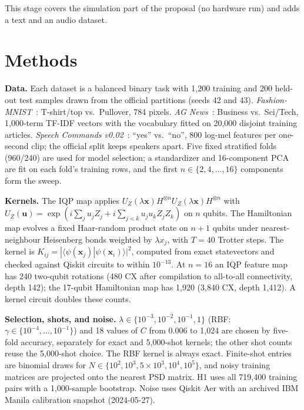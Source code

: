 \documentclass[conference]{IEEEtran}
\begin{document}
This stage covers the simulation part of the proposal (no hardware run) and adds a text and an audio dataset.

\section{Methods}
\textbf{Data.} Each dataset is a balanced binary task with 1{,}200 training and 200 held-out test samples drawn from the official partitions (seeds 42 and 43). \emph{Fashion-MNIST}~\cite{xiao2017fashion}: T-shirt/top vs.\ Pullover, 784 pixels. \emph{AG News}~\cite{zhang2015character}: Business vs.\ Sci/Tech, 1{,}000-term TF-IDF vectors with the vocabulary fitted on 20{,}000 disjoint training articles. \emph{Speech Commands v0.02}~\cite{warden2018speech}: ``yes'' vs.\ ``no'', 800 log-mel features per one-second clip; the official split keeps speakers apart. Five fixed stratified folds (960/240) are used for model selection; a standardizer and 16-component PCA are fit on each fold's training rows, and the first $n\in\{2,4,\dots,16\}$ components form the sweep.

\textbf{Kernels.} The IQP map applies $U_Z(\lambda\mathbf{x})H^{\otimes n}U_Z(\lambda\mathbf{x})H^{\otimes n}$ with $U_Z(\mathbf{u})=\exp(i\sum_j u_jZ_j+i\sum_{j<k}u_ju_kZ_jZ_k)$ on $n$ qubits. The Hamiltonian map evolves a fixed Haar-random product state on $n+1$ qubits under nearest-neighbour Heisenberg bonds weighted by $\lambda x_j$, with $T=40$ Trotter steps. The kernel is $K_{ij}=|\langle\psi(\mathbf{x}_j)|\psi(\mathbf{x}_i)\rangle|^{2}$, computed from exact statevectors and checked against Qiskit circuits to within $10^{-13}$. At $n=16$ an IQP feature map has 240 two-qubit rotations (480 CX after compilation to all-to-all connectivity, depth 142); the 17-qubit Hamiltonian map has 1{,}920 (3{,}840 CX, depth 1{,}412). A kernel circuit doubles these counts.

\textbf{Selection, shots, and noise.} $\lambda\in\{10^{-3},10^{-2},10^{-1},1\}$ (RBF: $\gamma\in\{10^{-4},\dots,10^{-1}\}$) and 18 values of $C$ from 0.006 to 1{,}024 are chosen by five-fold accuracy, separately for exact and 5{,}000-shot kernels; the other shot counts reuse the 5{,}000-shot choice. The RBF kernel is always exact. Finite-shot entries are binomial draws for $N\in\{10^{2},10^{3},5{\times}10^{3},10^{4},10^{5}\}$, and noisy training matrices are projected onto the nearest PSD matrix. H1 uses all 719{,}400 training pairs with a 1{,}000-sample bootstrap. Noise uses Qiskit Aer with an archived IBM Manila calibration snapshot (2024-05-27).
\end{document}
